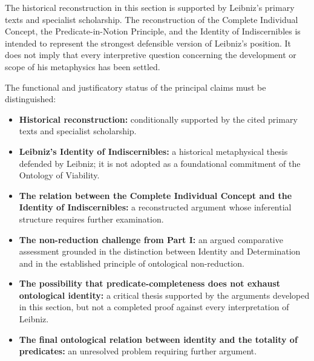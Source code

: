 The historical reconstruction in this section
is supported by Leibniz's primary texts and
specialist scholarship. The reconstruction
of the Complete Individual Concept, the
Predicate-in-Notion Principle, and the
Identity of Indiscernibles is intended
to represent the strongest defensible
version of Leibniz's position. It does
not imply that every interpretive question
concerning the development or scope of
his metaphysics has been settled.

\label{para:VS.B01.P01.C08.S07.SS12.P002}

The functional and justificatory status
of the principal claims must be distinguished:

\begin{itemize}
    \item \textbf{Historical reconstruction:}
    conditionally supported by the cited
    primary texts and specialist scholarship.

    \item \textbf{Leibniz's Identity of
    Indiscernibles:}
    a historical metaphysical thesis
    defended by Leibniz; it is not adopted
    as a foundational commitment of
    the Ontology of Viability.

    \item \textbf{The relation between the
    Complete Individual Concept and the
    Identity of Indiscernibles:}
    a reconstructed argument whose
    inferential structure requires
    further examination.

    \item \textbf{The non-reduction challenge
    from Part I:}
    an argued comparative assessment
    grounded in the distinction between
    Identity and Determination and in
    the established principle of
    ontological non-reduction.

    \item \textbf{The possibility that
    predicate-completeness does not
    exhaust ontological identity:}
    a critical thesis supported by the
    arguments developed in this section,
    but not a completed proof against
    every interpretation of Leibniz.

    \item \textbf{The final ontological
    relation between identity and the
    totality of predicates:}
    an unresolved problem requiring
    further argument.
\end{itemize}

\label{para:VS.B01.P01.C08.S07.SS12.P003}

